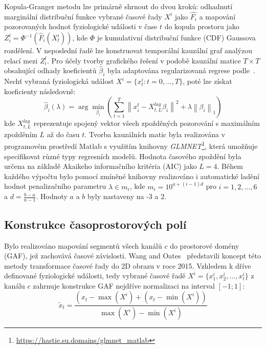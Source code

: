 Kopula-Granger metodu lze primárně shrnout do dvou kroků: odhadnutí marginální
distribuční funkce vybrané časové řady $X^i$ jako $\hat{F_i}$ a mapování
pozorovaných hodnot fyziologické události v čase $t$ do kopula prostoru jako
$Z_{i}^t=\Phi^{-1}\left(\hat{F}_i\left(X_{t}^i\right)\right)$, kde $\Phi$ je
kumulativní distribuční funkce (\gls{CDF}) Gaussova rozdělení. V neposlední řadě
lze konstruovat temporální kauzální graf analýzou relací mezi $Z_{i}^t$. Pro
účely tvorby grafického řešení v podobě kauzální matice $T \times T$ obsahující
odhady koeficientů $\hat{\beta}_i$ byla adaptována regularizovaná regrese
podle~\cite{Bahdori2012}. Nechť vybraná fyziologická událost $X^i = \{x_t^i : t
= 0,...,T\}$, poté lze získat koeficienty následovně:
\begin{equation}
    \hat{\beta}_i(\lambda)=\arg \min _{\beta_i}\left(\sum_{t=1}^T\left\|x_i^t-X_{t, L}^{lag} \beta_i\right\|^2+\lambda\left\|\beta_i\right\|_1\right)
\end{equation}
kde $X_{t, L}^{lag}$ reprezentuje spojený vektor všech zpožděných pozorování s
maximálním zpožděním $L$ až do času $t$. Tvorba kauzálních matic byla
realizována v programovém prostředí Matlab s využitím knihovny
\textit{GLMNET}\footnote{\url{https://hastie.su.domains/glmnet_matlab}}, která
umožňuje specifikovat různé typy regresních modelů. Hodnota časového zpoždění
byla určena na základě Akaikeho informačního kritéria (\gls{AIC}) jako $L = 4$.
Během každého výpočtu bylo pomocí zmíněné knihovny realizováno i automatické
ladění hodnot penalizačního parametru $\lambda \in m_i$, kde $m_i = 10^{a +
(i-1)d}$ pro $i = {1, 2, ..., 6}$ a $d = \frac{b-a}{n-1}$. Hodnoty $a$ a $b$
byly nastaveny na -3 a 2.

\subsection{Konstrukce časoprostorových polí}
\label{subsec:gadf}
Bylo realizováno mapování segmentů všech kanálů $c$ do prostorové domény
(\gls{GAF}), jež zachovává časové závislosti. Wang and Oates~\cite{Wang2015}
představili koncept této metody transformace časové řady do 2D obrazu v roce
2015. Vzhledem k dříve definované fyziologické události, tedy vybrané časové
řadě $X^i = \{x_1^i, x_2^i, \dots, x_t^i\}$ z kanálu $c$ zahrnuje konstrukce
\gls{GAF} nejdříve normalizaci na interval $[-1; 1]$:
\begin{equation}
    \tilde{x}_t=\frac{\left(x_t-\max (X^i)+\left(x_t-\min (X^i)\right)\right.}{\max (X^i)-\min (X^i)}
\end{equation}

